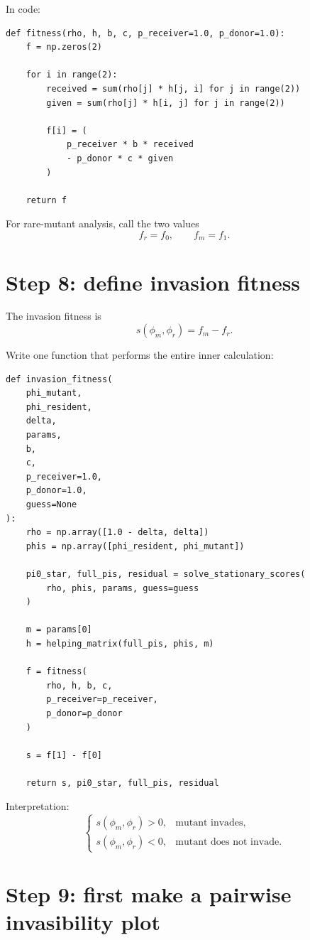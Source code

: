 \documentclass[11pt]{article}
\begin{document}
In code:

\begin{lstlisting}
def fitness(rho, h, b, c, p_receiver=1.0, p_donor=1.0):
    f = np.zeros(2)

    for i in range(2):
        received = sum(rho[j] * h[j, i] for j in range(2))
        given = sum(rho[j] * h[i, j] for j in range(2))

        f[i] = (
            p_receiver * b * received
            - p_donor * c * given
        )

    return f
\end{lstlisting}

For rare-mutant analysis, call the two values
\[
f_r=f_0,
\qquad
f_m=f_1.
\]

\section{Step 8: define invasion fitness}

The invasion fitness is
\[
\boxed{
 s(\phi_m,\phi_r)=f_m-f_r.
}
\]

Write one function that performs the entire inner calculation:

\begin{lstlisting}
def invasion_fitness(
    phi_mutant,
    phi_resident,
    delta,
    params,
    b,
    c,
    p_receiver=1.0,
    p_donor=1.0,
    guess=None
):
    rho = np.array([1.0 - delta, delta])
    phis = np.array([phi_resident, phi_mutant])

    pi0_star, full_pis, residual = solve_stationary_scores(
        rho, phis, params, guess=guess
    )

    m = params[0]
    h = helping_matrix(full_pis, phis, m)

    f = fitness(
        rho, h, b, c,
        p_receiver=p_receiver,
        p_donor=p_donor
    )

    s = f[1] - f[0]

    return s, pi0_star, full_pis, residual
\end{lstlisting}

Interpretation:
\[
\begin{cases}
s(\phi_m,\phi_r)>0, & \text{mutant invades},\\
s(\phi_m,\phi_r)<0, & \text{mutant does not invade}.
\end{cases}
\]

\section{Step 9: first make a pairwise invasibility plot}
\end{document}
